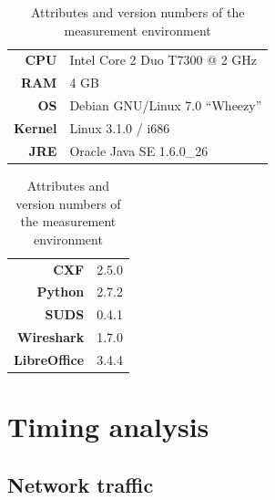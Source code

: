 \begin{table}[htbp]
 \centering
 \toprule
 \begin{minipage}[t]{0.55\linewidth}
  \centering
  \begin{tabular}{rl}
  \textbf{CPU} & Intel Core 2 Duo T7300 @ 2 GHz \\
  \textbf{RAM} & 4 GB \\
  \textbf{OS} & Debian GNU/Linux 7.0 ``Wheezy'' \\
  \textbf{Kernel} & Linux 3.1.0 / i686 \\
  \textbf{JRE} & Oracle Java SE 1.6.0\_26 \\
  \end{tabular}
 \end{minipage}
 \begin{minipage}[t]{0.3\linewidth}
  \centering
  \begin{tabular}{rl}
  \textbf{CXF} & 2.5.0 \\
  \textbf{Python} & 2.7.2 \\
  \textbf{SUDS} & 0.4.1 \\
  \textbf{Wireshark} & 1.7.0 \\
  \textbf{LibreOffice} & 3.4.4
  \end{tabular}
 \end{minipage}
 \bottomrule
 \caption{Attributes and version numbers of the measurement environment}
 \label{tab:measurenv}
\end{table}

\section{Timing analysis}

\subsection{Network traffic}
\label{traffic}

\begin{table}[htbp]
 \begin{center}
  
  \caption{Network traffic generated by CXF and SUDS invocation}
  \label{tab:stat_packet}
 \end{center}
\end{table}

